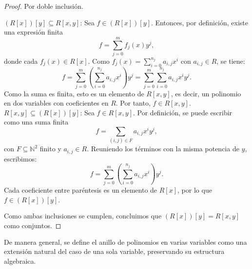 \begin{proof}
	Por doble inclusión.
	
	\medskip
	
	\noindent \( (R[x])[y] \subseteq R[x,y] \): 
	Sea \( f \in (R[x])[y] \). Entonces, por definición, existe una expresión finita
	\[
	f = \sum_{j=0}^m f_j(x) y^j,
	\]
	donde cada \( f_j(x) \in R[x] \). Como \( f_j(x) = \sum_{i=0}^{n_j} a_{i,j} x^i \) con \( a_{i,j} \in R \), se tiene:
	\[
	f = \sum_{j=0}^m \left( \sum_{i=0}^{n_j} a_{i,j} x^i \right) y^j = \sum_{j=0}^m \sum_{i=0}^{n_j} a_{i,j} x^i y^j.
	\]
	Como la suma es finita, esto es un elemento de \( R[x,y] \), es decir, un polinomio en dos variables con coeficientes en \( R \). Por tanto, \( f \in R[x,y] \).\\
	
	\noindent \( R[x,y] \subseteq (R[x])[y] \):
	Sea \( f \in R[x,y] \). Por definición, se puede escribir como una suma finita
	\[
	f = \sum_{(i,j) \in F} a_{i,j} x^i y^j,
	\]
	con \( F \subseteq \mathbb{N}^2 \) finito y \( a_{i,j} \in R \). Reuniendo los términos con la misma potencia de \( y \), escribimos:
	\[
	f = \sum_{j=0}^m \left( \sum_{i=0}^{n_j} a_{i,j} x^i \right) y^j.
	\]
	Cada coeficiente entre paréntesis es un elemento de \( R[x] \), por lo que \( f \in (R[x])[y] \).
	
	\medskip
	
	\noindent Como ambas inclusiones se cumplen, concluimos que \( (R[x])[y] = R[x,y] \) como conjuntos.
\end{proof}

\begin{observacion}
\end{observacion}


\vspace{0.5cm}
De manera general, se define el anillo de polinomios en varias variables como una extensión natural del caso de una sola variable, preservando su estructura algebraica.

